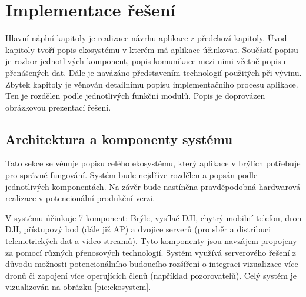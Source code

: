 \chapter{Implementace řešení}
Hlavní náplní kapitoly je realizace návrhu aplikace z předchozí kapitoly. Úvod kapitoly tvoří popis ekosystému v kterém má aplikace účinkovat. Součástí popisu je rozbor jednotlivých komponent, popis komunikace mezi nimi včetně popisu přenášených dat. Dále je navázáno představením technologií použitých při vývinu. Zbytek kapitoly je věnován detailnímu popisu implementačního procesu aplikace. Ten je rozdělen podle jednotlivých funkční modulů. Popis je doprovázen obrázkovou prezentací řešení.
\section{Architektura a komponenty systému } \label{sec:architektura}
Tato sekce se věnuje popisu celého ekosystému, který aplikace v brýlích potřebuje pro správné fungování. Systém bude nejdříve rozdělen a popsán podle jednotlivých komponentách. Na závěr bude nastíněna pravděpodobná hardwarová realizace v potencionální produkční verzi.

V systému účinkuje 7 komponent: Brýle, vysílač DJI\texttrademark, chytrý mobilní telefon, dron DJI\texttrademark, přístupový bod (dále již AP) a dvojice serverů (pro sběr a distribuci telemetrických dat a video streamů). Tyto komponenty jsou navzájem propojeny za pomocí různých přenosových technologií. Systém využívá serverového řešení z důvodu možnosti potencionálního budoucího rozšíření o integraci vizualizace více dronů či zapojení více operujících členů (například pozorovatelů).
Celý systém je vizualizován na obrázku \ref{pic:ekosystem}.
